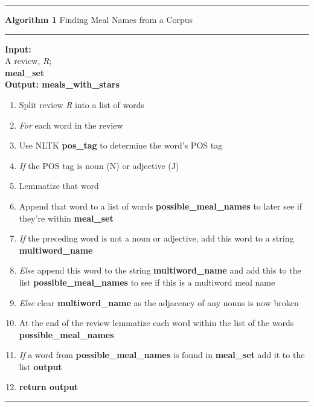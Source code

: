 \documentclass[12pt, openany]{scrbook}
\begin{document}
\newpage
\vspace{12pt}
\hrule
\vspace{2pt}
\textbf{Algorithm 1} Finding Meal Names from a Corpus
\vspace{2pt}
\hrule
\vspace{2pt}
\textbf{Input:}\\A review, \emph{R};\\\textbf{meal\_set}\\
\textbf{Output:	meals\_with\_stars}
\begin{enumerate}[nosep]
  \item Split review \emph{R} into a list of words
  \item \emph{For} each word in the review
  \item Use NLTK \textbf{pos\_tag} to determine the word's POS tag
  \item \emph{If} the POS tag is noun (N) or adjective (J) 
  \item \hspace{12pt} Lemmatize that word
  \item \hspace{12pt} Append that word to a list of words \textbf{possible\_meal\_names}
	to later see if they're within \textbf{meal\_set}
  \item \hspace{12pt} \emph{If} the preceding word is not a noun or adjective,
	add this word to a string \textbf{multiword\_name} 
  \item \hspace{12pt} \emph{Else} append this word to the string \textbf{multiword\_name}
	and add this to the list \textbf{possible\_meal\_names} to see if this is a multiword meal name
  \item \emph{Else} clear \textbf{multiword\_name} as the adjacency of any nouns is now broken
  \item At the end of the review lemmatize each word within the list of
	the words \textbf{possible\_meal\_names}
  \item \emph{If} a word from \textbf{possible\_meal\_names} is found in
	\textbf{meal\_set} add it to the list \textbf{output}
  \item \textbf{return output}
\end{enumerate}
\vspace{8pt}
\hrule
\vspace{12pt}
\end{document}

